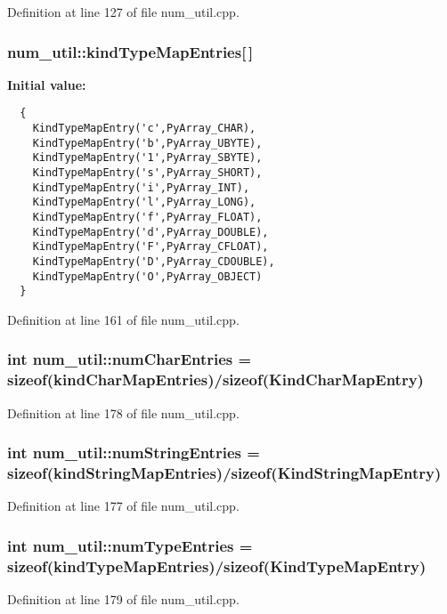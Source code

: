 Definition at line 127 of file num\_\-util.cpp.
\subsubsection{ {\bf num\_\-util::kind\-Type\-Map\-Entries}[$\,$]}\label{namespacenum__util_a5}


{\bf Initial value:}

\footnotesize\begin{verbatim}
  {
    KindTypeMapEntry('c',PyArray_CHAR),
    KindTypeMapEntry('b',PyArray_UBYTE),
    KindTypeMapEntry('1',PyArray_SBYTE),
    KindTypeMapEntry('s',PyArray_SHORT),
    KindTypeMapEntry('i',PyArray_INT),
    KindTypeMapEntry('l',PyArray_LONG),
    KindTypeMapEntry('f',PyArray_FLOAT),
    KindTypeMapEntry('d',PyArray_DOUBLE),
    KindTypeMapEntry('F',PyArray_CFLOAT),
    KindTypeMapEntry('D',PyArray_CDOUBLE),
    KindTypeMapEntry('O',PyArray_OBJECT)
  }
\end{verbatim}\normalsize 


Definition at line 161 of file num\_\-util.cpp.
\subsubsection{\setlength{\rightskip}{0pt plus 5cm}int {\bf num\_\-util::num\-Char\-Entries} = sizeof({\bf kind\-Char\-Map\-Entries})/sizeof({\bf Kind\-Char\-Map\-Entry})}\label{namespacenum__util_a7}




Definition at line 178 of file num\_\-util.cpp.
\subsubsection{\setlength{\rightskip}{0pt plus 5cm}int {\bf num\_\-util::num\-String\-Entries} = sizeof({\bf kind\-String\-Map\-Entries})/sizeof({\bf Kind\-String\-Map\-Entry})}\label{namespacenum__util_a6}




Definition at line 177 of file num\_\-util.cpp.
\subsubsection{\setlength{\rightskip}{0pt plus 5cm}int {\bf num\_\-util::num\-Type\-Entries} = sizeof({\bf kind\-Type\-Map\-Entries})/sizeof({\bf Kind\-Type\-Map\-Entry})}\label{namespacenum__util_a8}




Definition at line 179 of file num\_\-util.cpp.